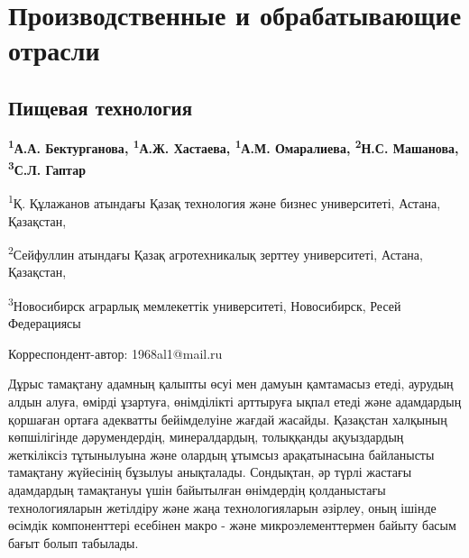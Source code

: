 \newpage
\let\cleardoublepage\clearpage
\part{Производственные и обрабатывающие отрасли}
\chapter{Пищевая технология}

\begin{articleheader}

{\bfseries
\textsuperscript{1}А.А. Бектурганова\textsuperscript{\envelope },
\textsuperscript{1}А.Ж. Хастаева,
\textsuperscript{1}А.М. Омаралиева,
\textsuperscript{2}Н.С. Машанова,
\textsuperscript{3}С.Л. Гаптар
}
\end{articleheader}

\begin{affiliation}
\textsuperscript{1}Қ. Құлажанов атындағы Қазақ технология және бизнес университеті, Астана, Қазақстан,

\textsuperscript{2}Сейфуллин атындағы Қазақ агротехникалық зерттеу университеті, Астана, Қазақстан,

\textsuperscript{3}Новосибирск аграрлық мемлекеттік университеті, Новосибирск, Ресей Федерациясы

\raggedright \textsuperscript{\envelope }Корреспондент-автор: 1968al1@mail.ru
\end{affiliation}

Дұрыс тамақтану адамның қалыпты өсуі мен дамуын қамтамасыз етеді,
аурудың алдын алуға, өмірді ұзартуға, өнімділікті арттыруға ықпал етеді
және адамдардың қоршаған ортаға адекватты бейімделуіне жағдай жасайды.
Қазақстан халқының көпшілігінде дәрумендердің, минералдардың, толыққанды
ақуыздардың жеткіліксіз тұтынылуына және олардың ұтымсыз арақатынасына
байланысты тамақтану жүйесінің бұзылуы анықталады. Сондықтан, әр түрлі
жастағы адамдардың тамақтануы үшін байытылған өнімдердің қолданыстағы
технологияларын жетілдіру және жаңа технологияларын әзірлеу, оның ішінде
өсімдік компоненттері есебінен макро - және микроэлементтермен байыту
басым бағыт болып табылады.

